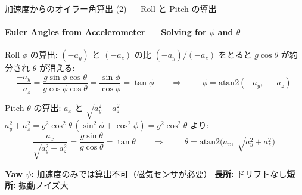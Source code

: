 \documentclass[aspectratio=169, 14pt]{beamer}
\begin{document}
\begin{frame}{加速度からのオイラー角算出 (2) --- Roll と Pitch の導出}
  \framesubtitle{Euler Angles from Accelerometer --- Solving for $\phi$ and $\theta$}

  \begin{block}{Roll $\phi$ の算出: $(-a_y)$ と $(-a_z)$ の比}
    {\small
    $(-a_y)/(-a_z)$ をとると $g\cos\theta$ が約分され $\theta$ が消える:
    }
    \vspace{-0.5em}
    {\footnotesize
    \[
    \frac{-a_y}{-a_z}
    = \frac{g\sin\phi\cos\theta}{g\cos\phi\cos\theta}
    = \frac{\sin\phi}{\cos\phi}
    = \tan\phi
    \qquad\Longrightarrow\qquad
    \boxed{\;\phi = \mathrm{atan2}(-a_y,\; -a_z)\;}
    \]
    }
  \end{block}

  \vspace{-0.5em}

  \begin{block}{Pitch $\theta$ の算出: $a_x$ と $\sqrt{a_y^2 + a_z^2}$}
    {\small
    $a_y^2 + a_z^2 = g^2\cos^2\!\theta\,(\sin^2\!\phi + \cos^2\!\phi) = g^2\cos^2\!\theta$ より:
    }
    \vspace{-0.5em}
    {\footnotesize
    \[
    \frac{a_x}{\sqrt{a_y^2 + a_z^2}}
    = \frac{g\sin\theta}{g\cos\theta}
    = \tan\theta
    \qquad\Longrightarrow\qquad
    \boxed{\;\theta = \mathrm{atan2}\!\bigl(a_x,\;\sqrt{a_y^2 + a_z^2}\bigr)\;}
    \]
    }
  \end{block}

  \vspace{-0.3em}

  {\scriptsize
    \textbf{Yaw $\psi$:} 加速度のみでは算出不可（磁気センサが必要）\quad
    \textbf{長所:} ドリフトなし\quad \textbf{短所:} 振動ノイズ大
  }
\end{frame}
\end{document}
